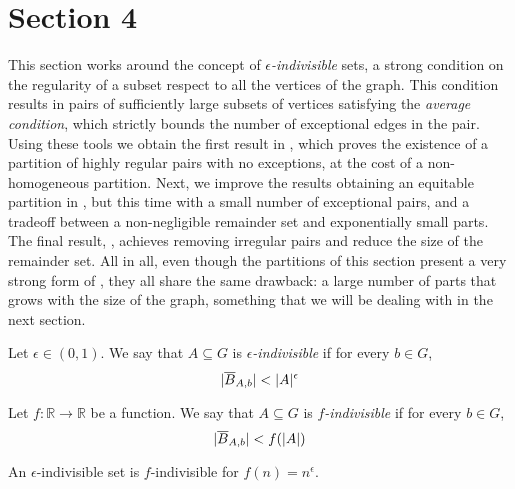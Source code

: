 \section{Section 4} \label{sec:section_4}

    This section works around the concept of \emph{$\epsilon$-indivisible} sets, a strong condition on the regularity of a subset
    respect to all the vertices of the graph.
    This condition results in pairs of sufficiently large subsets of vertices satisfying
    the \emph{average condition}, which strictly bounds the number of exceptional edges in the pair.
    Using these tools we obtain the first result in ,
    which proves the existence of a partition of highly regular pairs with no exceptions, at the cost of a
    non-homogeneous partition.
    Next, we improve the results obtaining an equitable partition in
    , but this time with a
    small number of exceptional pairs, and a tradeoff between a non-negligible remainder set and exponentially small parts.
    The final result, , achieves removing irregular pairs
    and reduce the size of the remainder set.
    All in all, even though the partitions of this section present a very strong form of , they all share
    the same drawback: a large number of parts that grows with the size of the graph, something that we will be dealing
    with in the next section.

    \begin{definition}[Definition 4.2(a)] \label{def:epsilon_indivisible}
        Let $\epsilon \in (0,1)$.
        We say that $A \subseteq G$ is \emph{$\epsilon$-indivisible} if for every $b \in G$,
        \[
            | \overline{B}_{A,b} | < |A|^{\epsilon}
        \]
    \end{definition}

    \begin{definition}[Definition 4.2(b)] \label{def:f_indivisible}
        Let $f: \mathbb{R} \longrightarrow \mathbb{R}$ be a function.
        We say that $A \subseteq G$ is \emph{$f$-indivisible} if for every $b \in G$,
        \[
            | \overline{B}_{A,b} | < f(|A|)
        \]
    \end{definition}

    \begin{remark}
        An $\epsilon$-indivisible set is $f$-indivisible for $f(n) = n^\epsilon$.
    \end{remark}

